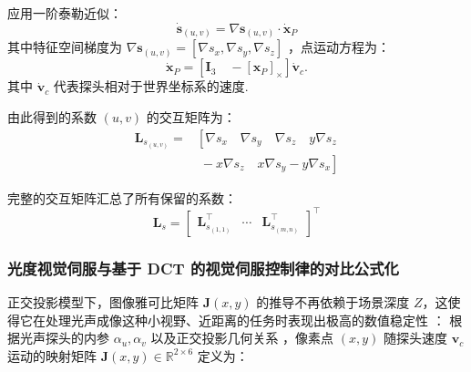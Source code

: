 \documentclass{article}
\begin{document}
应用一阶泰勒近似：
\begin{equation}
\dot{\boldsymbol{s}}_{(u,v)} = \nabla \boldsymbol{s}_{(u,v)} \cdot \dot{\boldsymbol{x}}_P
\end{equation}
其中特征空间梯度为 $\nabla \boldsymbol{s}_{(u,v)} = [\nabla s_x, \nabla s_y, \nabla s_z]$ ，点运动方程为：
\begin{equation}
\dot{\boldsymbol{x}}_P = \left[ \boldsymbol{I}_3 \quad -[\boldsymbol{x}_P]_\times \right] \dot{\mathbf{v}}_c.
\end{equation}
其中 $\dot{\mathbf{v}}_c$ 代表探头相对于世界坐标系的速度.

由此得到的系数 $(u,v)$ 的交互矩阵为：
\begin{equation} \label{eq:L_s_uv}
	\begin{aligned}
		\boldsymbol{L}_{s_{(u,v)}} = 
		& \left[\nabla s_x \quad \nabla s_y \quad \nabla s_z \quad y\nabla s_z \right. \\
		&\left.\; -x\nabla s_z \quad x\nabla s_y - y\nabla s_x\right]
	\end{aligned}
\end{equation}

完整的交互矩阵汇总了所有保留的系数：
\begin{equation}
\boldsymbol{L}_s = 
\begin{bmatrix}
\boldsymbol{L}_{s_{(1,1)}}^\top & \cdots & \boldsymbol{L}_{s_{(m,n)}}^\top
\end{bmatrix}^\top
\label{L_S}
\end{equation}

\subsubsection{光度视觉伺服与基于 DCT 的视觉伺服控制律的对比公式化}
\label{comparative Formulation}


正交投影模型下，图像雅可比矩阵 $\mathbf{J}(x, y)$ 的推导不再依赖于场景深度 $Z$，这使得它在处理光声成像这种小视野、近距离的任务时表现出极高的数值稳定性 ：
根据光声探头的内参 $\alpha_u, \alpha_v$ 以及正交投影几何关系 ，像素点 $(x, y)$ 随探头速度 $\mathbf{v}_c$ 运动的映射矩阵 $\mathbf{J}(x, y) \in \mathbb{R}^{2 \times 6}$ 定义为：
\end{document}
